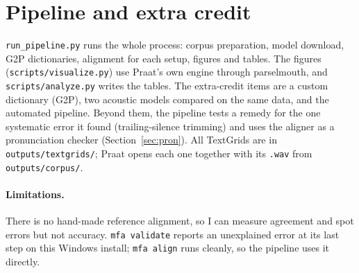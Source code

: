 \documentclass[11pt,a4paper]{article}
\newcommand{\code}[1]{\texttt{#1}}
\begin{document}
\section{Pipeline and extra credit}
\code{run\_pipeline.py} runs the whole process: corpus preparation, model download, G2P dictionaries, alignment
for each setup, figures and tables. The figures (\code{scripts/visualize.py}) use Praat's own engine through
parselmouth, and \code{scripts/analyze.py} writes the tables. The extra-credit items are a custom dictionary
(G2P), two acoustic models compared on the same data, and the automated pipeline. Beyond them, the pipeline tests
a remedy for the one systematic error it found (trailing-silence trimming) and uses the aligner as a pronunciation
checker (Section~\ref{sec:pron}). All TextGrids are in \code{outputs/textgrids/}; Praat
opens each one together with its \code{.wav} from \code{outputs/corpus/}.

\paragraph{Limitations.} There is no hand-made reference alignment, so I can measure agreement and spot errors
but not accuracy. \code{mfa validate} reports an unexplained error at its last step on this Windows install;
\code{mfa align} runs cleanly, so the pipeline uses it directly.
\end{document}
